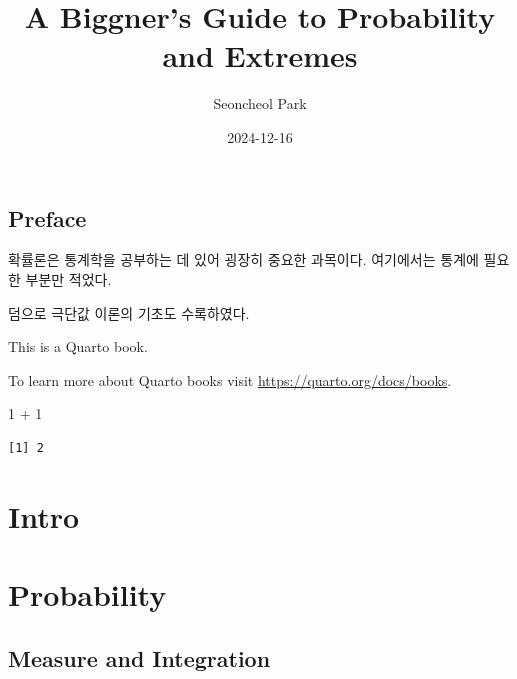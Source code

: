 \documentclass[
  13pt,
  letterpaper,
  DIV=11,
  numbers=noendperiod]{scrreprt}
\title{A Biggner's Guide to Probability and Extremes}
\author{Seoncheol Park}
\date{2024-12-16}
\newenvironment{Shaded}{\begin{snugshade}}{\end{snugshade}}
\newcommand{\DecValTok}[1]{\textcolor[rgb]{0.68,0.00,0.00}{#1}}
\newcommand{\SpecialCharTok}[1]{\textcolor[rgb]{0.37,0.37,0.37}{#1}}
\renewcommand*\contentsname{Table of contents}
\newcommand\contentsname{Table of contents}
\theoremstyle{plain}
\theoremstyle{definition}
\theoremstyle{definition}
\theoremstyle{plain}
\theoremstyle{definition}
\theoremstyle{plain}
\theoremstyle{remark}
\begin{document}
\maketitle

\renewcommand{\Return}{\State \textbf{return}~}
\newcommand{\Print}{\State \textbf{print}~}
\newcommand{\Break}{\State \textbf{break}}
\newcommand{\Continue}{\State \textbf{continue}}
\newcommand{\True}{\textbf{true}}
\newcommand{\False}{\textbf{false}}
\renewcommand{\And}{\textbf{and}~}
\newcommand{\Or}{\textbf{or}~}
\renewcommand{\Not}{\textbf{not}~}
\newcommand{\To}{\textbf{to}~}
\newcommand{\DownTo}{\textbf{downto}~}


\renewcommand*\contentsname{Table of contents}
{
\hypersetup{linkcolor=}
\setcounter{tocdepth}{2}
\tableofcontents
}

\chapter*{Preface}\label{preface}


확률론은 통계학을 공부하는 데 있어 굉장히 중요한 과목이다. 여기에서는
통계에 필요한 부분만 적었다.

덤으로 극단값 이론의 기초도 수록하였다.

This is a Quarto book.

To learn more about Quarto books visit
\url{https://quarto.org/docs/books}.

\begin{Shaded}
\begin{Highlighting}[]
\DecValTok{1} \SpecialCharTok{+} \DecValTok{1}
\end{Highlighting}
\end{Shaded}

\begin{verbatim}
[1] 2
\end{verbatim}

\part{Intro}

\part{Probability}

\chapter{Measure and Integration}\label{sec-measure}
\end{document}
